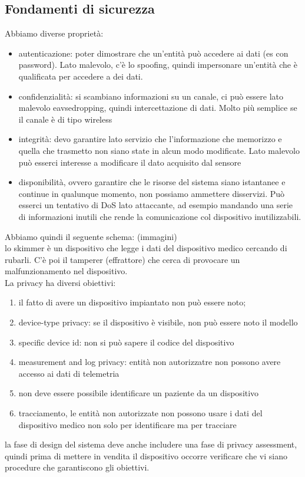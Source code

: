 \documentclass[oneside, 12pt]{extbook}
\begin{document}
\subsection{Fondamenti di sicurezza}
Abbiamo diverse proprietà:
\begin{itemize}
	\item autenticazione: poter dimostrare che un'entità può accedere ai dati (es con password). Lato malevolo, c'è lo spoofing, quindi impersonare un'entità che è qualificata per accedere a dei dati.
	\item confidenzialità: si scambiano informazioni su un canale, ci può essere lato malevolo eavsedropping, quindi intercettazione di dati. Molto più semplice se il canale è di tipo wireless
	\item integrità: devo garantire lato servizio che l'informazione che memorizzo e quella che trasmetto non siano state in alcun modo modificate. Lato malevolo può esserci interesse a modificare il dato acquisito dal sensore
	\item disponibilità, ovvero garantire che le risorse del sistema siano istantanee e continue in qualunque momento, non possiamo ammettere disservizi. Può esserci un tentativo di DoS lato attaccante, ad esempio mandando una serie di informazioni inutili che rende la comunicazione col dispositivo inutilizzabili.
\end{itemize}
Abbiamo quindi il seguente schema:
(immagini)\\lo skimmer è un dispositivo che legge i dati del dispositivo medico cercando di rubarli. C'è poi il tamperer (effrattore) che cerca di provocare un malfunzionamento nel dispositivo.\\La privacy ha diversi obiettivi:
\begin{enumerate}
	\item il fatto di avere un dispositivo impiantato non può essere noto;
	\item device-type privacy: se il dispositivo è visibile, non può essere noto il modello
	\item specific device id: non si può sapere il codice del dispositivo
	\item measurement and log privacy: entità non autorizzatre non possono avere accesso ai dati di telemetria
	\item non deve essere possibile identificare un paziente da un dispositivo
	\item tracciamento, le entità non autorizzate non possono usare i dati del dispositivo medico non solo per identificare ma per tracciare
\end{enumerate}
la fase di design del sistema deve anche includere una fase di privacy assessment, quindi prima di mettere in vendita il dispositivo occorre verificare che vi siano procedure che garantiscono gli obiettivi.
\end{document}
